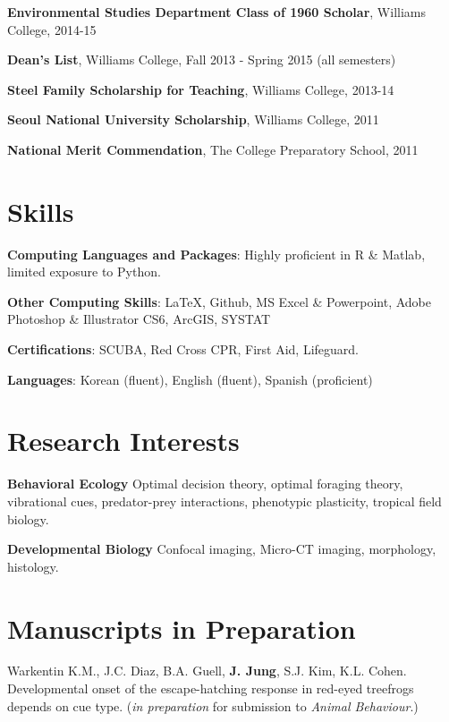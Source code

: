 \documentclass[margin,line]{res}
\begin{document}
\begin{resume}
\vspace*{-3.5mm}
{\bf Environmental Studies Department Class of 1960 Scholar}, Williams College, 2014-15

\vspace*{-3.5mm}
{\bf Dean's List}, Williams College, Fall 2013 - Spring 2015 (all semesters)

\vspace*{-3.5mm}
{\bf Steel Family Scholarship for Teaching}, Williams College, 2013-14

\vspace*{-3.5mm}
{\bf Seoul National University Scholarship}, Williams College, 2011

\vspace*{-3.5mm}
{\bf National Merit Commendation}, The College Preparatory School, 2011

\section{\sc Skills} 
{\bf Computing Languages and Packages}:  Highly proficient in R \& Matlab, limited exposure to Python. 
\vspace*{-3mm}

{\bf Other Computing Skills}: \LaTeX, Github, MS Excel \& Powerpoint, Adobe Photoshop \& Illustrator CS6, ArcGIS, SYSTAT
\vspace*{-3mm}

{\bf Certifications}: SCUBA, Red Cross CPR, First Aid, Lifeguard. 
\vspace*{-3mm}

{\bf Languages}: Korean (fluent), English (fluent), Spanish (proficient)

\section{\sc Research Interests}
{\bf Behavioral Ecology} Optimal decision theory, optimal foraging theory, vibrational cues, predator-prey interactions, phenotypic plasticity, tropical field biology. 

\vspace{-.3cm}
{\bf Developmental Biology} Confocal imaging, Micro-CT imaging, morphology, histology. 

\section{\sc Manuscripts in Preparation}

Warkentin K.M., J.C. Diaz, B.A. Guell, {\bf J. Jung}, S.J. Kim, K.L. Cohen. {Developmental onset of the escape-hatching response in red-eyed treefrogs depends on cue type.} ({\it in preparation}  for submission to {\it Animal Behaviour}.) 


\end{resume}
\end{document}
